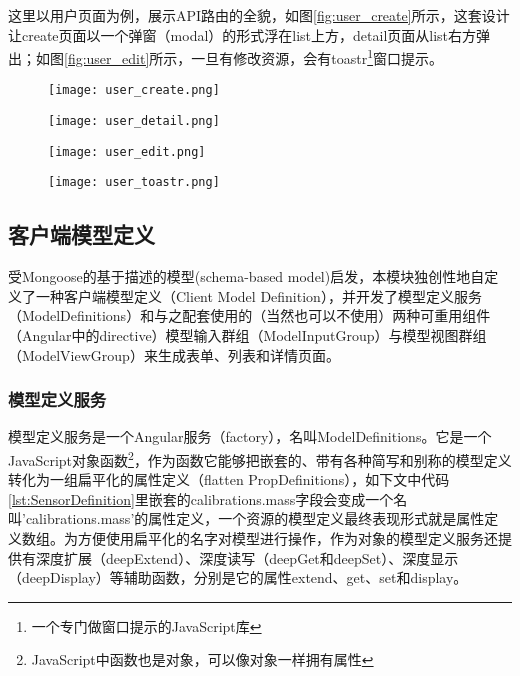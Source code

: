 这里以用户页面为例，展示API路由的全貌，如图\ref{fig:user_create}所示，这套设计让create页面以一个弹窗（modal）的形式浮在list上方，detail页面从list右方弹出；如图\ref{fig:user_edit}所示，一旦有修改资源，会有toastr\footnote{一个专门做窗口提示的JavaScript库}窗口提示。
\begin{figure}[H]
 \centering
 \texttt{[image: user\_create.png]}

 \vspace{0.5cm}

 \texttt{[image: user\_detail.png]}
\end{figure}
\begin{figure}[H]
 \centering
 \texttt{[image: user\_edit.png]}

 \vspace{0.5cm}

 \texttt{[image: user\_toastr.png]}
\end{figure}

\subsection{客户端模型定义}
受Mongoose的基于描述的模型(schema-based model)启发，本模块独创性地自定义了一种客户端模型定义（Client Model Definition），并开发了模型定义服务（ModelDefinitions）和与之配套使用的（当然也可以不使用）两种可重用组件（Angular中的directive）模型输入群组（ModelInputGroup）与模型视图群组（ModelViewGroup）来生成表单、列表和详情页面。

\subsubsection{模型定义服务}
模型定义服务是一个Angular服务（factory），名叫ModelDefinitions。它是一个JavaScript对象函数\footnote{JavaScript中函数也是对象，可以像对象一样拥有属性}，作为函数它能够把嵌套的、带有各种简写和别称的模型定义转化为一组扁平化的属性定义（flatten PropDefinitions），如下文中代码\ref{lst:SensorDefinition}里嵌套的calibrations.mass字段会变成一个名叫'calibrations.mass'的属性定义，一个资源的模型定义最终表现形式就是属性定义数组。为方便使用扁平化的名字对模型进行操作，作为对象的模型定义服务还提供有深度扩展（deepExtend）、深度读写（deepGet和deepSet）、深度显示（deepDisplay）等辅助函数，分别是它的属性extend、get、set和display。

